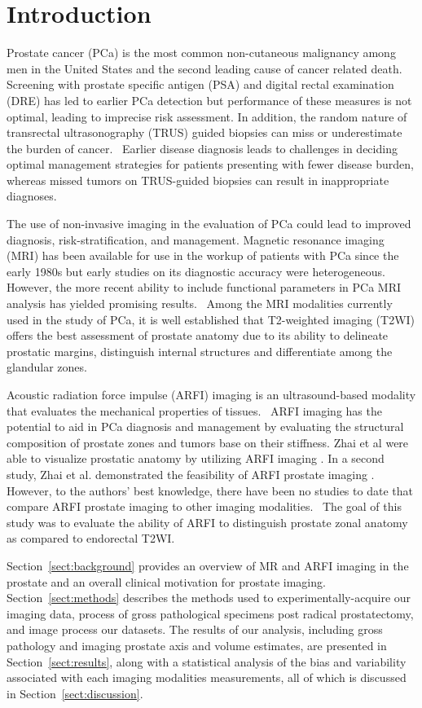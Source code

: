 \section{Introduction}\label{sect:intro}

Prostate cancer (PCa) is the most common non-cutaneous malignancy among men in
the United States and the second leading cause of cancer related
death.~\cite{Howlander2011} Screening with prostate specific antigen (PSA) and
digital rectal examination (DRE) has led to earlier PCa detection but
performance of these measures is not optimal, leading to imprecise risk
assessment.  In addition, the random nature of transrectal ultrasonography
(TRUS) guided biopsies can miss or underestimate the burden of
cancer.~\cite{Gupta2013} Earlier disease diagnosis leads to challenges in
deciding optimal management strategies for patients presenting with fewer
disease burden, whereas missed tumors on TRUS-guided biopsies can result in
inappropriate diagnoses. 

The use of non-invasive imaging in the evaluation of PCa could lead to improved
diagnosis, risk-stratification, and management. Magnetic resonance imaging
(MRI) has been available for use in the workup of patients with PCa since the
early 1980s but early studies on its diagnostic accuracy were heterogeneous.
However, the more recent ability to include functional parameters in PCa MRI
analysis has yielded promising results.~\cite{Gupta2013,Hricak2007} Among the
MRI modalities currently used in the study of PCa, it is well established that
T2-weighted imaging (T2WI) offers the best assessment of prostate anatomy due
to its ability to delineate prostatic margins, distinguish internal structures
and differentiate among the glandular zones. 

Acoustic radiation force impulse (ARFI) imaging is an ultrasound-based modality
that evaluates the mechanical properties of tissues.~\cite{Nightingale2002}
ARFI imaging has the potential to aid in PCa diagnosis and management by
evaluating the structural composition of prostate zones and tumors base on
their stiffness.  Zhai et al were able to visualize prostatic anatomy by
utilizing ARFI imaging \exvivo. In a second study, Zhai et al. demonstrated the
feasibility of ARFI prostate imaging \inviv\invivo.~\cite{Zhai2012}  However, to the authors’ best
knowledge, there have been no studies to date that compare \invivo ARFI
prostate imaging to other imaging modalities.~\cite{Zhai2010} The goal of this
study was to evaluate the ability of ARFI to distinguish prostate zonal anatomy
\invivo as compared to endorectal T2WI. 

Section~\ref{sect:background} provides an overview of MR and ARFI imaging in
the prostate and an overall clinical motivation for prostate imaging.
Section~\ref{sect:methods} describes the methods used to experimentally-acquire
our imaging data, process of gross pathological specimens post radical
prostatectomy, and image process our datasets.  The results of our analysis,
including gross pathology and imaging prostate axis and volume estimates, are
presented in Section~\ref{sect:results}, along with a statistical analysis of
the bias and variability associated with each imaging modalities measurements,
all of which is discussed in Section~\ref{sect:discussion}.
